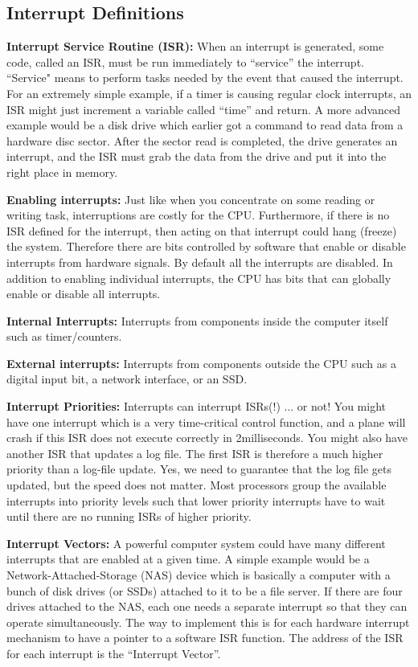 \subsection{Interrupt Definitions}

{\bf Interrupt Service Routine (ISR):} When an interrupt is generated, some code, 
called an ISR, must be run immediately to “service” the interrupt.   ``Service"
means to perform tasks needed by the event that caused the interrupt.   For an 
extremely simple example, if a timer is causing regular clock interrupts, an ISR 
might just increment a variable called “time” and return.  A more advanced 
example would be a disk drive which earlier got a command to read data from a 
hardware disc sector.    After the sector read is completed, the drive generates 
an interrupt, and the ISR must grab the data from the drive and put it into the 
right place in memory. 

{\bf Enabling interrupts:  } Just like when you concentrate on some reading or 
writing task, interruptions are costly for the CPU.  Furthermore, if there is no 
ISR defined for the interrupt, then acting on that interrupt could hang (freeze) 
the system.   Therefore there are bits controlled by software that enable or 
disable interrupts from hardware signals.   By default all the interrupts are 
disabled.    In addition to enabling individual interrupts, the CPU has bits 
that can globally enable or disable all interrupts.

{\bf Internal Interrupts:} Interrupts from components inside the computer itself such as timer/counters. 

{\bf External interrupts: } Interrupts from components outside the CPU such as a digital input bit, a network interface, or an SSD.

{\bf Interrupt Priorities:}   Interrupts can interrupt ISRs(!)  ... or not!    You might have one interrupt which is a very time-critical control function, and a plane will crash if this ISR does not execute correctly in 2milliseconds.   You might also have another ISR that updates a log file.   The first ISR is therefore a much higher priority than a log-file update.   Yes, we need to guarantee that the log file gets updated, but the speed does not matter.    Most processors group the available interrupts into priority levels such that lower priority interrupts have to wait until there are no running ISRs of higher priority. 

{\bf Interrupt Vectors: }    A powerful computer system could have many different interrupts that are enabled at a given time.   A simple example would be a Network-Attached-Storage (NAS) device which is basically a computer with a bunch of disk drives (or SSDs) attached to it to be a file server.    If there are four drives attached to the NAS, each one needs a separate interrupt so that they can operate simultaneously.   The way to implement this is for each hardware interrupt mechanism to have a pointer to a software ISR function.    The address of the ISR for each interrupt is the “Interrupt Vector”.  

